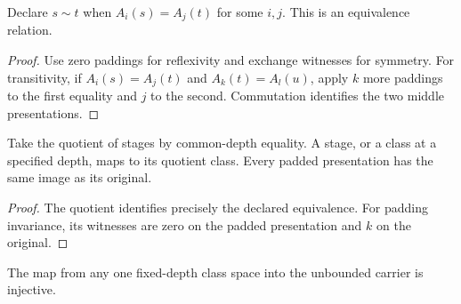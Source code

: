 

\begin{lemma}
Declare $s\sim t$ when $A_i(s)=A_j(t)$ for some $i,j$. This is an equivalence relation.
\end{lemma}

\begin{proof}
Use zero paddings for reflexivity and exchange witnesses for symmetry. For transitivity, if $A_i(s)=A_j(t)$ and $A_k(t)=A_l(u)$, apply $k$ more paddings to the first equality and $j$ to the second. Commutation identifies the two middle presentations.
\end{proof}








\begin{lemma}
Take the quotient of stages by common-depth equality. A stage, or a class at a specified depth, maps to its quotient class. Every padded presentation has the same image as its original.
\end{lemma}

\begin{proof}
The quotient identifies precisely the declared equivalence. For padding invariance, its witnesses are zero on the padded presentation and $k$ on the original.
\end{proof}






\begin{lemma}
The map from any one fixed-depth class space into the unbounded carrier is injective.
\end{lemma}

